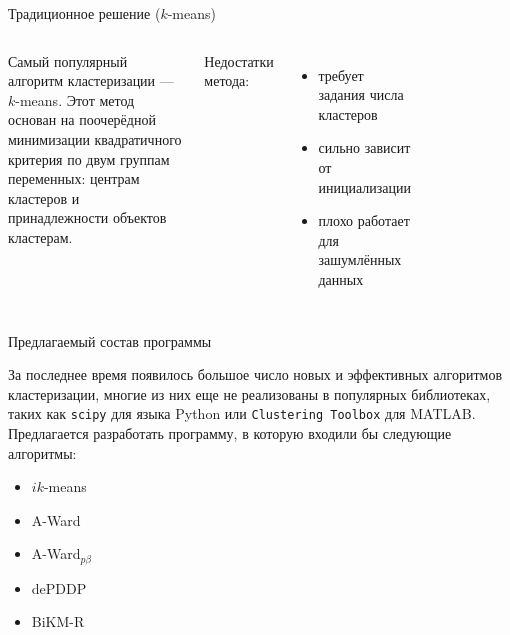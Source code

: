 \documentclass[aspectratio=169,tikz]{beamer}
\newcommand{\kmeans}{\mbox{$ k $-means}\xspace}
\newcommand{\AWard}{\mbox{A-Ward}\xspace}
\newcommand{\AWardpb}{\mbox{A-Ward$ _{p\beta} $}\xspace}
\newcommand{\BiKMR}{\mbox{BiKM-R}\xspace}
\newcommand{\dePDDP}{dePDDP\xspace}
\newcommand{\ikmeans}{\mbox{$ ik $-means}\xspace}
\begin{document}
	\begin{frame}{Традиционное решение (\kmeans)}

       \begin{columns}
       	

   		\parbox{\linewidth}{
	       	Самый популярный алгоритм кластеризации --- \kmeans. Этот метод основан на поочерёдной минимизации квадратичного критерия по двум группам переменных: центрам кластеров и принадлежности объектов кластерам.
		}

		\vspace*{1\baselineskip} 
       	Недостатки метода:
       	\begin{itemize}
       		\item требует задания числа кластеров
       		\item сильно зависит от инициализации
       		\item плохо работает для зашумлённых данных
	    \end{itemize}
       	
       	\centering
       	\vspace{-.4cm}
%
		\begin{figure} %
			\centering
			
		\end{figure}
       \end{columns} 

	\end{frame}

	\begin{frame}{Предлагаемый состав программы}

		\parbox{\linewidth}{За последнее время появилось большое число новых и эффективных алгоритмов кластеризации, многие из них еще не реализованы в популярных библиотеках, таких как \texttt{scipy} для языка Python или  \texttt{Clustering Toolbox} для MATLAB. Предлагается разработать программу, в которую входили бы следующие алгоритмы:}
		
       	\begin{itemize}
       		\item \ikmeans
       		\item \AWard
       		\item \AWardpb
       		\item \dePDDP
	       	\item \BiKMR
       	\end{itemize}
	
	\end{frame}
\end{document}
